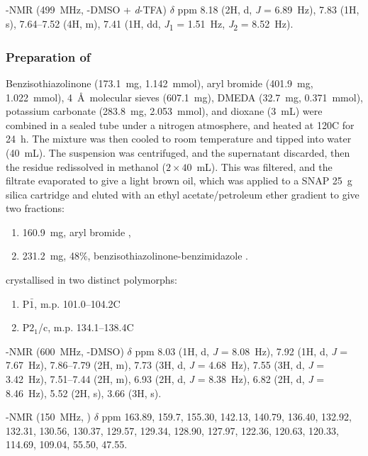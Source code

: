\begin{refsection}
-NMR (499~MHz, -DMSO + \textit{d}-TFA) $\delta$ ppm 8.18 (2H, d, \emph{J} = 6.89~Hz), 7.83 (1H, s), 7.64--7.52 (4H, m), 7.41 (1H, dd, \emph{J}\textsubscript{1} = 1.51~Hz, \emph{J}\textsubscript{2} = 8.52~Hz).

\subsubsection{Preparation of }
Benzisothiazolinone  (173.1~mg, 1.142~mmol), aryl bromide  (401.9~mg, 1.022~mmol), 4~\AA\ molecular sieves (607.1~mg), DMEDA (32.7~mg, 0.371~mmol), potassium carbonate (283.8~mg, 2.053~mmol), and dioxane (3~mL) were combined in a sealed tube under a nitrogen atmosphere, and heated at 120\degree{}C for 24~h.
The mixture was then cooled to room temperature and tipped into water (40~mL).
The suspension was centrifuged, and the supernatant discarded, then the residue redissolved in methanol ($2\times40$~mL).
This was filtered, and the filtrate evaporated to give a light brown oil, which was applied to a SNAP 25~g silica cartridge and eluted with an ethyl acetate/petroleum ether gradient to give two fractions:
\begin{enumerate}
    \item 160.9~mg, aryl bromide ,
    \item 231.2~mg, 48\%, benzisothiazolinone-benzimidazole .
\end{enumerate}

 crystallised in two distinct polymorphs:
\begin{enumerate}
    \item P$\bar{1}$, m.p. 101.0--104.2\degree{}C
    \item P$2_1$/c, m.p. 134.1--138.4\degree{}C
\end{enumerate}

-NMR (600~MHz, -DMSO) $\delta$ ppm 8.03 (1H, d, \emph{J} = 8.08~Hz), 7.92 (1H, d, \emph{J} = 7.67~Hz), 7.86--7.79 (2H, m), 7.73 (3H, d, \emph{J} = 4.68~Hz), 7.55 (3H, d, \emph{J} = 3.42~Hz), 7.51--7.44 (2H, m), 6.93 (2H, d, \emph{J} = 8.38~Hz), 6.82 (2H, d, \emph{J} = 8.46~Hz), 5.52 (2H, s), 3.66 (3H, s).

-NMR (150~MHz, ) $\delta$ ppm 163.89, 159.7, 155.30, 142.13, 140.79, 136.40, 132.92, 132.31, 130.56, 130.37, 129.57, 129.34, 128.90, 127.97, 122.36, 120.63, 120.33, 114.69, 109.04, 55.50, 47.55.


\end{refsection}
